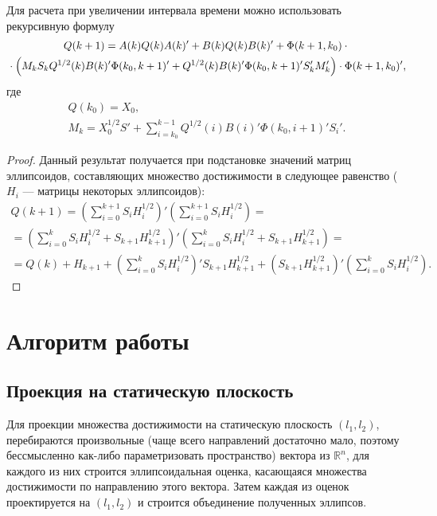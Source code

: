 \documentclass[10pt, a4paper]{article}
\begin{document}
\begin{theorem}
Для расчета при увеличении интервала времени можно использовать рекурсивную формулу
	\begin{gather}
		\notag Q(k+1) = A(k)Q(k)A(k)' + B(k)Q(k)B(k)' + \Phi(k+1,k_0)\cdot {}\\
		\label{recurrent_good}
		{} \cdot \left( M_k S_k Q^{1/2}(k)B(k)'\Phi(k_0,k+1)' + Q^{1/2}(k)B(k)'\Phi(k_0,k+1)'S_k'M_k' \right) \cdot \Phi(k+1,k_0)',
	\end{gather}
	где
	\begin{gather}
		Q(k_0) = X_0,\\
		M_k = X_0^{1/2}S'+\sum\limits_{i=k_0}^{k-1}Q^{1/2}(i)B(i)'\Phi(k_0,i+1)'S_i'.
	\end{gather}
\end{theorem}
\begin{proof}
Данный результат получается при подстановке значений матриц эллипсоидов, составляющих множество достижимости в следующее равенство ($H_i$ --- матрицы некоторых эллипсоидов):
\begin{gather}
	Q(k+1) = \left(\sum\limits_{i=0}^{k+1}S_iH_i^{1/2}\right)'\left(\sum\limits_{i=0}^{k+1}S_iH_i^{1/2}\right) = \\
	= \left(\sum\limits_{i=0}^{k}S_iH_i^{1/2} + S_{k+1}H_{k+1}^{1/2} \right)'\left(\sum\limits_{i=0}^{k}S_iH_i^{1/2} + S_{k+1}H_{k+1}^{1/2}\right) = \\
	= Q(k) + H_{k+1} + \left(\sum\limits_{i=0}^{k}S_iH_i^{1/2}\right)' S_{k+1}H_{k+1}^{1/2} +
	\left(  S_{k+1}H_{k+1}^{1/2} \right)'\left(\sum\limits_{i=0}^{k}S_iH_i^{1/2}\right).
\end{gather}
\end{proof}

\section{Алгоритм работы}
\subsection{Проекция на статическую плоскость}
Для проекции множества достижимости на статическую плоскость $(l_1,l_2)$, перебираются произвольные (чаще всего направлений достаточно мало, поэтому бессмысленно как-либо параметризовать пространство) вектора из $\mathbb{R}^n$, для каждого из них строится эллипсоидальная оценка, касающаяся множества достижимости по направлению этого вектора. Затем каждая из оценок проектируется на $(l_1,l_2)$ и строится объединение полученных эллипсов.
\end{document}
